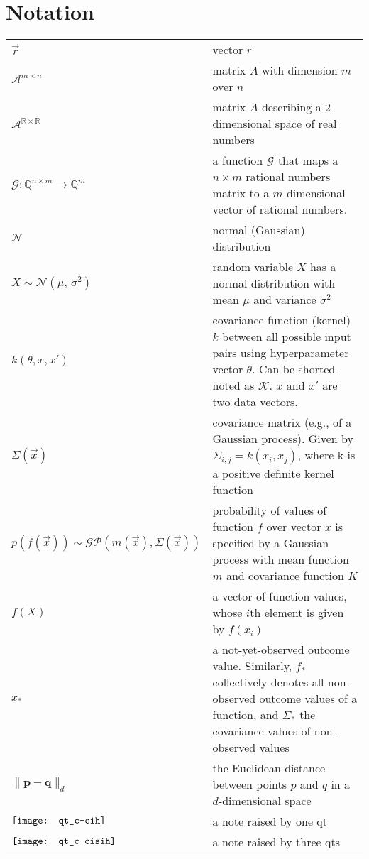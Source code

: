 \section*{Notation}
\begin{tabularx}{\linewidth}{l@{\quad}X}
	$\vec{r}$ & vector $r$ \\
	$\mathcal{A}^{m \times n}$ & matrix $A$ with dimension $m$ over $n$ \\
	$\mathcal{A}^{\mathbb{R} \times \mathbb{R}}$ & matrix $A$ describing a 2-dimensional space of real numbers \\
	$\mathcal{G}: \mathbb{Q}^{n \times m} \longrightarrow \mathbb{Q}^{m}$ & a function $\mathcal{G}$ that maps a $n \times m$ rational numbers matrix to a $m$-dimensional vector of rational numbers.\\
	$\mathcal{N}$ 	&	normal (Gaussian) distribution \\
	$X \sim \mathcal{N}(\mu,\,\sigma^{2})$	&	random variable $X$ has a normal distribution with mean $\mu$ and variance $\sigma^{2}$ \\
	$k\left( \theta, x, x' \right)$ & covariance function (kernel) $k$ between all possible input pairs using hyperparameter vector $\theta$. Can be shorted-noted as $\mathcal{K}$. $x$ and $x'$ are two data vectors. \\
	$\Sigma(\vec{x})$	&	covariance matrix (e.g., of a Gaussian process). Given by $\Sigma_{i,j} = k(x_i, x_j)$, where k is a positive definite kernel function \\
	$p\left( f \left( \vec{x} \right) \right) \sim \mathcal{GP}\left( m(\vec{x}), \Sigma(\vec{x}) \right)$	&	probability of values of function $f$ over vector $x$ is specified by a Gaussian process with mean function $m$ and covariance function $K$ \\
	$f(X)$	&	a vector of function values, whose $i$th element is given by $f(x_i)$ \\
	$x_*$	&	a not-yet-observed outcome value. Similarly, $f_*$ collectively denotes all non-observed outcome values of a function, and $\Sigma_*$ the covariance values of non-observed values \\
	$\lVert \mathbf{p - q} \rVert_d$ & the Euclidean distance between points $p$ and $q$ in a $d$-dimensional space\\
	$\vcenter{\hbox{\texttt{[image: qt\_c-cih]}}}$	& a note raised by one \acl{qt}\\
	$\vcenter{\hbox{\texttt{[image: qt\_c-cisih]}}}$	& a note raised by three \aclp{qt}\\
\end{tabularx}
  	
